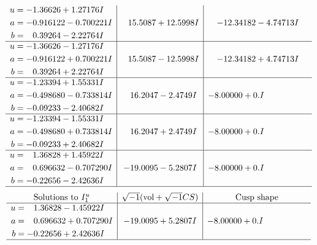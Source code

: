 \documentclass[1p]{elsarticle_modified}
\theoremstyle{definition}
\newcommand{\I}{\sqrt{-1}}
\begin{document}
$$\begin{array}{c|c|c}
\begin{aligned}
u &= -1.36626 + 1.27176 I \\
a &= -0.916122 - 0.700221 I \\
b &= \phantom{-}0.39264 - 2.22764 I\end{aligned}
 & \phantom{-}15.5087 + 12.5998 I & -12.34182 - 4.74713 I \\ \hline\begin{aligned}
u &= -1.36626 - 1.27176 I \\
a &= -0.916122 + 0.700221 I \\
b &= \phantom{-}0.39264 + 2.22764 I\end{aligned}
 & \phantom{-}15.5087 - 12.5998 I & -12.34182 + 4.74713 I \\ \hline\begin{aligned}
u &= -1.23394 + 1.55331 I \\
a &= -0.498680 - 0.733814 I \\
b &= -0.09233 - 2.40682 I\end{aligned}
 & \phantom{-}16.2047 - 2.4749 I & -8.00000 + 0. I\phantom{ +0.000000I} \\ \hline\begin{aligned}
u &= -1.23394 - 1.55331 I \\
a &= -0.498680 + 0.733814 I \\
b &= -0.09233 + 2.40682 I\end{aligned}
 & \phantom{-}16.2047 + 2.4749 I & -8.00000 + 0. I\phantom{ +0.000000I} \\ \hline\begin{aligned}
u &= \phantom{-}1.36828 + 1.45922 I \\
a &= \phantom{-}0.696632 - 0.707290 I \\
b &= -0.22656 - 2.42636 I\end{aligned}
 & -19.0095 - 5.2807 I & -8.00000 + 0. I\phantom{ +0.000000I}\\
 \hline 
 \end{array}$$\newpage$$\begin{array}{c|c|c}  
\text{Solutions to }I^u_{1}& \I (\text{vol} + \sqrt{-1}CS) & \text{Cusp shape}\\
 \hline 
\begin{aligned}
u &= \phantom{-}1.36828 - 1.45922 I \\
a &= \phantom{-}0.696632 + 0.707290 I \\
b &= -0.22656 + 2.42636 I\end{aligned}
 & -19.0095 + 5.2807 I & -8.00000 + 0. I\phantom{ +0.000000I}\\
 \hline 
 \end{array}$$\newpage\newpage\renewcommand{\arraystretch}{1}
\end{document}
